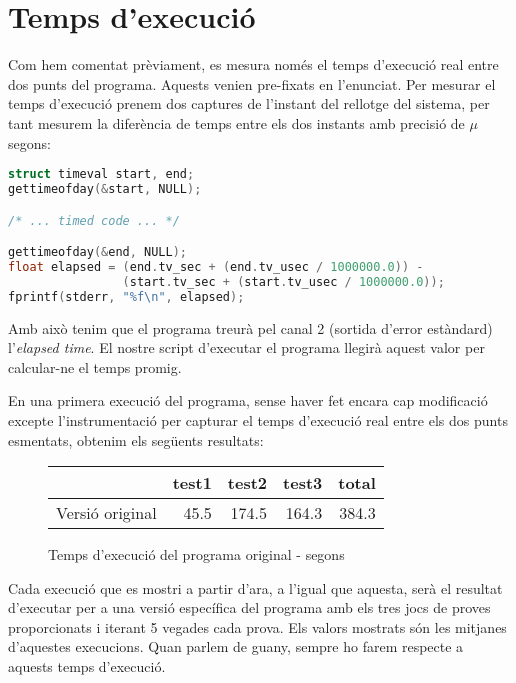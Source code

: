 \section{Temps d'execució}

Com hem comentat prèviament, es mesura només el temps d'execució real entre dos punts del programa. Aquests venien pre-fixats en l'enunciat. Per mesurar el temps d'execució prenem dos captures de l'instant del rellotge del sistema, per tant mesurem la diferència de temps entre els dos instants amb precisió de $\mu$ segons:

\begin{lstlisting}[label=timer, caption=Mesura del temps d'execució real, language=C]
struct timeval start, end;
gettimeofday(&start, NULL);

/* ... timed code ... */

gettimeofday(&end, NULL);
float elapsed = (end.tv_sec + (end.tv_usec / 1000000.0)) -
                (start.tv_sec + (start.tv_usec / 1000000.0));
fprintf(stderr, "%f\n", elapsed);
\end{lstlisting}

Amb això tenim que el programa treurà pel canal 2 (sortida d'error estàndard) l'\emph{elapsed time}. El nostre script d'executar el programa llegirà aquest valor per calcular-ne el temps promig.

En una primera execució del programa, sense haver fet encara cap modificació excepte l'instrumentació per capturar el temps d'execució real entre els dos punts esmentats, obtenim els següents resultats:


\begin{figure}[ht]
  \caption{Temps d'execució del programa original - segons}\label{fig:elapsed_orig}
  \begin{center}
    \begin{tabular}{ l r r r r }
      & test1 & test2 & test3 & total \\
      \hline
      Versió original & 45.5 & 174.5 & 164.3 & 384.3 \\
    \end{tabular}
  \end{center}
\end{figure}

Cada execució que es mostri a partir d'ara, a l'igual que aquesta, serà el resultat d'executar per a una versió específica del programa amb els tres jocs de proves proporcionats i iterant 5 vegades cada prova. Els valors mostrats són les mitjanes d'aquestes execucions. Quan parlem de guany, sempre ho farem respecte a aquests temps d'execució.
